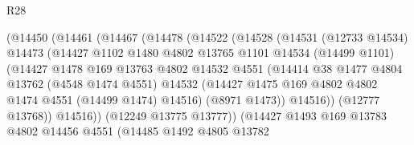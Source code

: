 \begin{lexlean}{R28}
\begin{coremodule}
                        (@14450
                          (@14461
                            (@14467
                              (@14478
                                (@14522
                                  (@14528
                                    (@14531
                                      (@12733 @14534)
                                      @14473
                                      (@14427
                                        @1102
                                        @1480
                                        @4802
                                        @13765
                                        @1101
                                        @14534
                                        (@14499 @1101)
                                        (@14427
                                          @1478
                                          @169
                                          @13763
                                          @4802
                                          @14532
                                          @4551
                                          (@14414
                                            @38
                                            @1477
                                            @4804
                                            @13762
                                            (@4548 @1474 @4551)
                                            @14532
                                            (@14427
                                              @1475
                                              @169
                                              @4802
                                              @4802
                                              @1474
                                              @4551
                                              (@14499 @1474)
                                              @14516)
                                            (@8971 @1473))
                                          @14516))
                                      (@12777 @13768))
                                    @14516))
                                (@12249 @13775 @13777))
                              (@14427
                                @1493
                                @169
                                @13783
                                @4802
                                @14456
                                @4551
                                (@14485
                                  @1492
                                  @4805
                                  @13782

\end{coremodule}
\end{lexlean}
